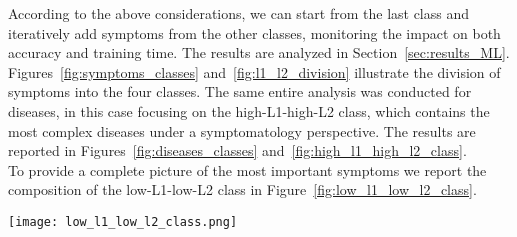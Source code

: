 \noindent
According to the above considerations, we can start from the last class and iteratively add symptoms from the
other classes, monitoring the impact on both accuracy and training time.
The results are analyzed in Section~\ref{sec:results_ML}.\\
Figures~\ref{fig:symptoms_classes} and~\ref{fig:l1_l2_division} illustrate the division of symptoms into the four classes.
The same entire analysis was conducted for diseases, in this case focusing on the high-L1-high-L2 class, which contains
the most complex diseases under a symptomatology perspective. The results are reported in Figures~\ref{fig:diseases_classes}
and~\ref{fig:high_l1_high_l2_class}.\\


\noindent
To provide a complete picture of the most important symptoms we report the composition of the low-L1-low-L2 class
in Figure~\ref{fig:low_l1_low_l2_class}.\\

\begin{figure*}[!t]
    \centering
    \texttt{[image: low\_l1\_low\_l2\_class.png]}
    \caption{Composition of the low-L1-low-L2 class for symptoms}
    \label{fig:low_l1_low_l2_class}
\end{figure*}






